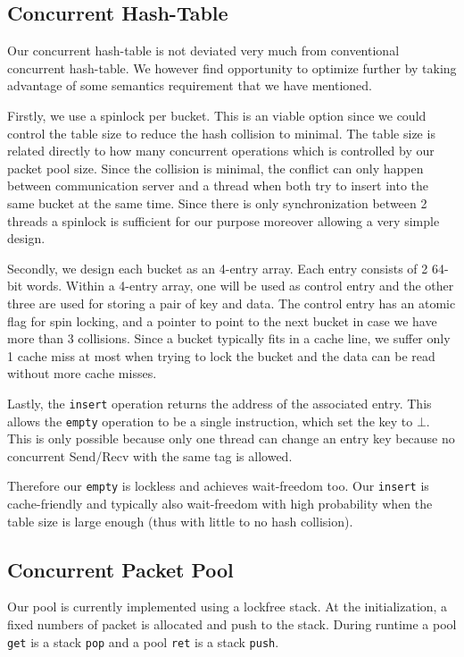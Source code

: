 \documentclass[11pt]{article}
\begin{document}
\subsection{Concurrent Hash-Table}
Our concurrent hash-table is not deviated very much from conventional
concurrent hash-table. We however find opportunity to optimize further by taking 
advantage of some semantics requirement that we have mentioned.

Firstly, we use a spinlock per bucket. This is an viable option since we could
control the table size to reduce the hash collision to minimal. The table size is
related directly to how many concurrent operations which is controlled by 
our packet pool size. Since the collision is minimal, the conflict can only happen
between communication server and a thread when both try to insert into the same
bucket at the same time. Since there is only synchronization between 2 threads
a spinlock is sufficient for our purpose moreover allowing a very simple design.

Secondly, we design each bucket as an 4-entry array. Each entry consists of 2
64-bit words. Within a 4-entry array, one will be used as control entry and the
other three are used for storing a pair of key and data. The control entry has
an atomic flag for spin locking, and a pointer to point to the next bucket in
case we have more than 3 collisions. Since a bucket typically fits in a cache
line, we suffer only 1 cache miss at most when trying to lock the bucket and
the data can be read without more cache misses.

Lastly, the \texttt{insert} operation returns the address of the associated
entry. This allows the \texttt{empty} operation to be a single instruction,
which set the key to $\bot$. This is only possible because only one thread can
change an entry key because no concurrent Send/Recv with the same tag is allowed.

Therefore our \texttt{empty} is lockless and achieves wait-freedom too. Our
\texttt{insert} is cache-friendly and typically also wait-freedom with high probability 
when the table size is large enough (thus with little to no hash collision).

\subsection{Concurrent Packet Pool}
Our pool is currently implemented using a lockfree stack. At the
initialization, a fixed numbers of packet is allocated and push to the stack.
During runtime a pool \texttt{get} is a stack \texttt{pop} and a pool
\texttt{ret} is a stack \texttt{push}.
\end{document}
